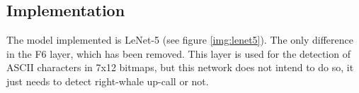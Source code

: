 \documentclass[]{article}
\begin{document}
\subsection{Implementation}\label{implementation}

The model implemented is LeNet-5 (see figure \ref{img:lenet5}). The only difference in the F6 layer, which has been removed. This layer is used for the detection of ASCII characters in 7x12 bitmaps, but this network does not intend to do so, it just needs to detect right-whale up-call or not.
\end{document}
